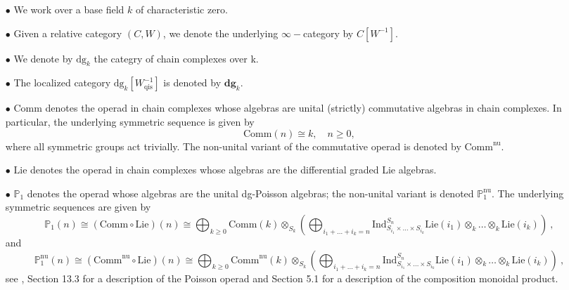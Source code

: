 \documentclass[10pt, oneside]{amsart}
\theoremstyle{plain}
\newcommand{\comm}{\mathrm{Comm}}
\newcommand{\dg}{\mathrm{dg}}
\newcommand{\Dg}{\mathbf{dg}}
\newcommand{\lie}{\mathrm{Lie}}
\newcommand{\PP}{\mathbb{P}}
\begin{document}
\begin{enumerate}

\item[$\bullet$] We work over a base field $k$ of characteristic zero.

\item[$\bullet$] Given a relative category $(C, W)$, we denote the underlying $\infty-$category by $C[W^{-1}]$.

\item[$\bullet$] We denote by $\dg_k$ the categry of chain complexes over k.

\item[$\bullet$] The localized category $\dg_k[W^{-1}_\text{qis}]$ is denoted by $\Dg_k$.

\item[$\bullet$] $\comm$ denotes the operad in chain complexes whose algebras are unital (strictly) commutative algebras in chain 
complexes. In particular, the underlying symmetric sequence is given by
\begin{equation*}
\comm(n) \cong k, \quad n \ge 0,
\end{equation*}
where all symmetric groups act trivially. The non-unital variant of the commutative operad is denoted by $\comm^\text{nu}$.

\item[$\bullet$] $\lie$ denotes the operad in chain complexes whose algebras are the differential graded Lie algebras.

\item[$\bullet$] $\PP_1$ denotes the operad whose algebras are the unital dg-Poisson algebras; the non-unital
variant is denoted $\PP_1^\text{nu}$.
The underlying symmetric sequences are given by
\begin{equation*}
\PP_1(n) \cong (\comm \circ \lie) (n) \cong \bigoplus_{k\ge 0} \comm(k) \otimes_{S_k} \left( \bigoplus_{i_1 + \ldots + i_k = n} \mathrm{Ind}_{S_{i_1}\times \ldots \times S_{i_k}}^{S_n} \lie(i_1) \otimes_k \ldots \otimes_k \lie(i_k) \right) \:,
\end{equation*}
and
\begin{equation*}
\PP^\text{nu}_1(n) \cong (\comm^\text{nu} \circ \lie) (n) \cong \bigoplus_{k\ge 0} \comm^\text{nu}(k) \otimes_{S_k} \left( \bigoplus_{i_1 + \ldots + i_k = n} \mathrm{Ind}_{S_{i_1}\times \ldots \times S_{i_k}}^{S_n} \lie(i_1) \otimes_k \ldots \otimes_k \lie(i_k) \right) \:,
\end{equation*}
see \cite{LV}, Section 13.3 for a description of the Poisson operad and Section 5.1 for a description of the composition monoidal 
product.


\end{enumerate}
\end{document}
